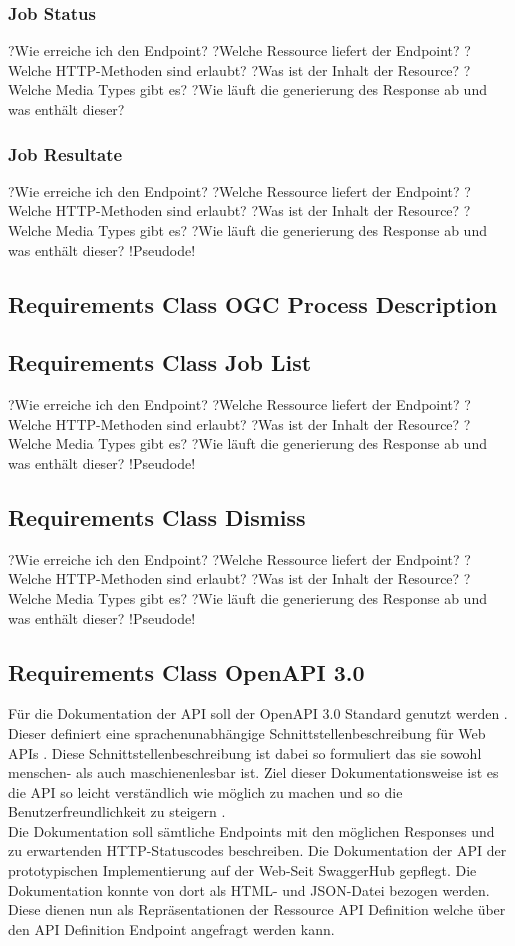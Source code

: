 \subsubsection{Job Status}?Wie erreiche ich den Endpoint?
?Welche Ressource liefert der Endpoint?
?Welche HTTP-Methoden sind erlaubt?
?Was ist der Inhalt der Resource?
?Welche Media Types gibt es?
?Wie läuft die generierung des Response ab und was enthält dieser?

\subsubsection{Job Resultate}
?Wie erreiche ich den Endpoint?
?Welche Ressource liefert der Endpoint?
?Welche HTTP-Methoden sind erlaubt?
?Was ist der Inhalt der Resource?
?Welche Media Types gibt es?
?Wie läuft die generierung des Response ab und was enthält dieser?
!Pseudode!
\subsection{Requirements Class OGC Process Description}
\subsection{Requirements Class Job List}
?Wie erreiche ich den Endpoint?
?Welche Ressource liefert der Endpoint?
?Welche HTTP-Methoden sind erlaubt?
?Was ist der Inhalt der Resource?
?Welche Media Types gibt es?
?Wie läuft die generierung des Response ab und was enthält dieser?
!Pseudode!
\subsection{Requirements Class Dismiss}
?Wie erreiche ich den Endpoint?
?Welche Ressource liefert der Endpoint?
?Welche HTTP-Methoden sind erlaubt?
?Was ist der Inhalt der Resource?
?Welche Media Types gibt es?
?Wie läuft die generierung des Response ab und was enthält dieser?
!Pseudode!
\subsection{Requirements Class OpenAPI 3.0}
Für die Dokumentation der API soll der OpenAPI 3.0 Standard genutzt werden \cite{ogc_api_processes_core}. 
Dieser definiert eine sprachenunabhängige Schnittstellenbeschreibung für Web APIs \cite{open_api}. 
Diese Schnittstellenbeschreibung ist dabei so formuliert das sie sowohl menschen- als auch maschienenlesbar ist. 
Ziel dieser Dokumentationsweise ist es die API so leicht verständlich wie möglich zu machen und so die Benutzerfreundlichkeit zu steigern \cite{open_api}. \\ 
Die Dokumentation soll sämtliche Endpoints mit den möglichen Responses und zu erwartenden HTTP-Statuscodes beschreiben. 
Die Dokumentation der API der prototypischen Implementierung auf der Web-Seit SwaggerHub gepflegt. Die Dokumentation konnte von dort als HTML- 
und JSON-Datei bezogen werden. Diese dienen nun als Repräsentationen der Ressource API Definition welche über den API Definition Endpoint angefragt werden kann. 


